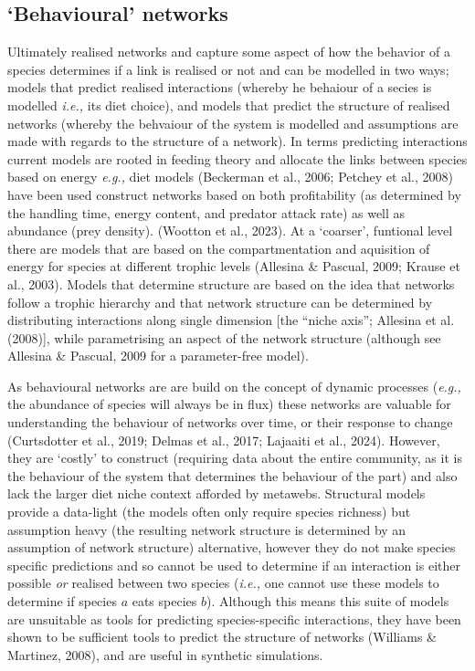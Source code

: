 \documentclass[
]{article}
\begin{document}
\subsection{`Behavioural' networks}\label{behavioural-networks}

Ultimately realised networks and capture some aspect of how the behavior
of a species determines if a link is realised or not and can be modelled
in two ways; models that predict realised interactions (whereby he
behaiour of a secies is modelled \emph{i.e.,} its diet choice), and
models that predict the structure of realised networks (whereby the
behvaiour of the system is modelled and assumptions are made with
regards to the structure of a network). In terms predicting interactions
current models are rooted in feeding theory and allocate the links
between species based on energy \emph{e.g.,} diet models (Beckerman et
al., 2006; Petchey et al., 2008) have been used construct networks based
on both profitability (as determined by the handling time, energy
content, and predator attack rate) as well as abundance (prey density).
(Wootton et al., 2023). At a `coarser', funtional level there are models
that are based on the compartmentation and aquisition of energy for
species at different trophic levels (Allesina \& Pascual, 2009; Krause
et al., 2003). Models that determine structure are based on the idea
that networks follow a trophic hierarchy and that network structure can
be determined by distributing interactions along single dimension {[}the
``niche axis''; Allesina et al. (2008){]}, while parametrising an aspect
of the network structure (although see Allesina \& Pascual, 2009 for a
parameter-free model).

As behavioural networks are are build on the concept of dynamic
processes (\emph{e.g.,} the abundance of species will always be in flux)
these networks are valuable for understanding the behaviour of networks
over time, or their response to change (Curtsdotter et al., 2019; Delmas
et al., 2017; Lajaaiti et al., 2024). However, they are `costly' to
construct (requiring data about the entire community, as it is the
behaviour of the system that determines the behaviour of the part) and
also lack the larger diet niche context afforded by metawebs. Structural
models provide a data-light (the models often only require species
richness) but assumption heavy (the resulting network structure is
determined by an assumption of network structure) alternative, however
they do not make species specific predictions and so cannot be used to
determine if an interaction is either possible \emph{or} realised
between two species (\emph{i.e.,} one cannot use these models to
determine if species \(a\) eats species \(b\)). Although this means this
suite of models are unsuitable as tools for predicting species-specific
interactions, they have been shown to be sufficient tools to predict the
structure of networks (Williams \& Martinez, 2008), and are useful in
synthetic simulations.
\end{document}
